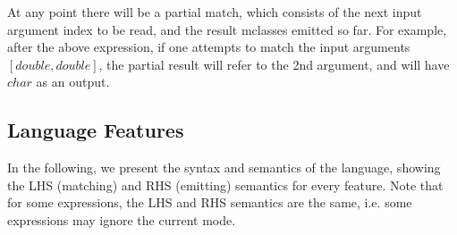 At any point there will be a partial match, which consists of the next
input argument index to be read, and the result mclasses emitted so far. For
example, after the above expression, if one attempts to match the input
arguments $[double, double]$, the partial result will refer to the 2nd
argument, and will have $char$ as an output.



\subsection{Language Features}
In the following, we present the syntax and semantics of the language,
showing the LHS (matching) and RHS (emitting) semantics for every feature. Note that
for some expressions, the LHS and RHS semantics are the same, i.e.
some expressions may ignore the current mode.

